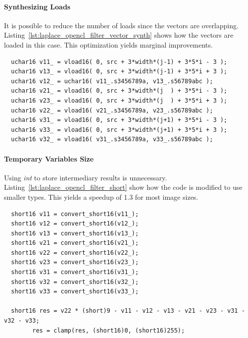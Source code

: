 \documentclass[11pt, a4paper, twoside]{montblanc}
\begin{document}
\paragraph{Synthesizing Loads} It is possible to reduce the number of loads
since the vectors are overlapping.
Listing~\ref{lst:laplace_opencl_filter_vector_synth} shows how the vectors are
loaded in this case. This optimization yields marginal improvements.

\begin{lstlisting}
  uchar16 v11_ = vload16( 0, src + 3*width*(j-1) + 3*5*i - 3 );
  uchar16 v13_ = vload16( 0, src + 3*width*(j-1) + 3*5*i + 3 );
  uchar16 v12_ = uchar16( v11_.s3456789a, v13_.s56789abc );
  uchar16 v21_ = vload16( 0, src + 3*width*(j  ) + 3*5*i - 3 );
  uchar16 v23_ = vload16( 0, src + 3*width*(j  ) + 3*5*i + 3 );
  uchar16 v22_ = vload16( v21_.s3456789a, v23_.s56789abc );
  uchar16 v31_ = vload16( 0, src + 3*width*(j+1) + 3*5*i - 3 );
  uchar16 v33_ = vload16( 0, src + 3*width*(j+1) + 3*5*i + 3 );
  uchar16 v32_ = vload16( v31_.s3456789a, v33_.s56789abc );
\end{lstlisting}

\paragraph{Temporary Variables Size} Using \textit{int} to store intermediary
results is unnecessary. Listing~\ref{lst:laplace_opencl_filter_short} show how
the code is modified to use smaller types. This yields a speedup of 1.3 for most
image sizes.

\begin{lstlisting}
  short16 v11 = convert_short16(v11_);
  short16 v12 = convert_short16(v12_);
  short16 v13 = convert_short16(v13_);
  short16 v21 = convert_short16(v21_);
  short16 v22 = convert_short16(v22_);
  short16 v23 = convert_short16(v23_);
  short16 v31 = convert_short16(v31_);
  short16 v32 = convert_short16(v32_);
  short16 v33 = convert_short16(v33_);

  short16 res = v22 * (short)9 - v11 - v12 - v13 - v21 - v23 - v31 - v32 - v33;
        res = clamp(res, (short16)0, (short16)255);
\end{lstlisting}
\end{document}
